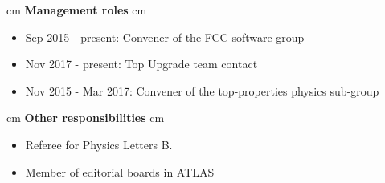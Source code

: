 \documentclass[12pt]{article}
\begin{document}




 cm
{\bf \large Management roles}
 cm
\begin{itemize}
\itemsep0em
\item[] Sep 2015 - present: Convener of the FCC software group
\item[] Nov 2017 - present: Top Upgrade team contact
\item[] Nov 2015 - Mar 2017: Convener of the top-properties physics sub-group
\end{itemize}

 cm
{\bf \large Other responsibilities}
 cm
\begin{itemize}
\itemsep0em
\item[] Referee for Physics Letters B.
\item[] Member of editorial boards in ATLAS
\end{itemize}
\end{document}
